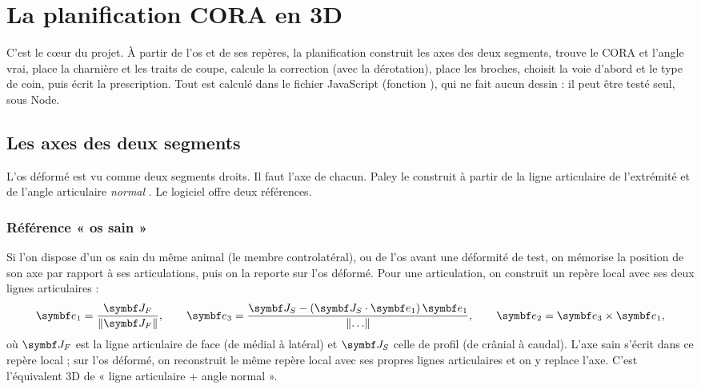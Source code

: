 \chapter{La planification CORA en 3D}
\label{chap:planification}

\begin{chapeau}
C'est le cœur du projet. À partir de l'os et de ses repères, la planification construit les axes des deux segments,
trouve le CORA et l'angle vrai, place la charnière et les traits de coupe, calcule la correction (avec la dérotation),
place les broches, choisit la voie d'abord et le type de coin, puis écrit la prescription. Tout est calculé dans le
fichier JavaScript  (fonction ), qui ne fait aucun
dessin : il peut être testé seul, sous Node.
\end{chapeau}

\section{Les axes des deux segments}
\label{sec:axes}

L'os déformé est vu comme deux segments droits. Il faut l'axe de chacun. Paley le construit à partir de la ligne
articulaire de l'extrémité et de l'angle articulaire \emph{normal} \cite{paley2002}. Le logiciel offre deux
références.

\subsection{Référence « os sain »}

Si l'on dispose d'un os sain du même animal (le membre controlatéral), ou de l'os avant une déformité de test, on
mémorise la position de son axe par rapport à ses articulations, puis on la reporte sur l'os déformé. Pour une
articulation, on construit un repère local avec ses deux lignes articulaires :
\begin{equation}
  \vb{e}_1 = \frac{\vb{J}_F}{\norm{\vb{J}_F}}, \qquad
  \vb{e}_3 = \frac{\vb{J}_S - (\vb{J}_S\cdot\vb{e}_1)\,\vb{e}_1}{\norm{\ldots}}, \qquad
  \vb{e}_2 = \vb{e}_3 \times \vb{e}_1,
\end{equation}
où $\vb{J}_F$ est la ligne articulaire de face (de médial à latéral) et $\vb{J}_S$ celle de profil (de crânial à
caudal). L'axe sain s'écrit dans ce repère local ; sur l'os déformé, on reconstruit le même repère local avec ses
propres lignes articulaires et on y replace l'axe. C'est l'équivalent 3D de « ligne articulaire + angle normal ».

